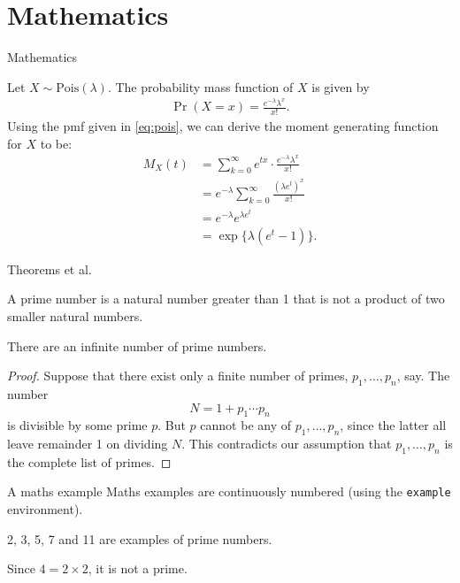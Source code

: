 \documentclass[]{beamer}
\begin{document}
\section{Mathematics}



\begin{frame}{Mathematics}

Let $X\sim\mathrm{Pois}(\lambda)$. 
The probability mass function of $X$ is given by
\begin{align}\label{eq:pois}
	\Pr(X=x) = \frac{e^{-\lambda}\lambda^x}{x!}.
\end{align}
Using the pmf given in \eqref{eq:pois}, we can derive the moment generating function for $X$ to be:
\begin{align*}
	M_X(t) 
	&= \sum_{k=0}^\infty e^{tx} \cdot \frac{e^{-\lambda}\lambda^x}{x!} \\
	&= e^{-\lambda} \sum_{k=0}^\infty  \frac{(\lambda e^t)^x}{x!} \\
	&= e^{-\lambda}  e^{\lambda e^t} \\
	&= \exp\{\lambda(e^t - 1) \}.
\end{align*}


\end{frame}

\begin{frame}{Theorems et al.}

\begin{definition}
	A prime number is a natural number greater than 1 that is not a product of two smaller natural numbers.
\end{definition}

\begin{theorem}
	There are an infinite number of prime numbers.
\end{theorem}

\begin{proof}
	Suppose that there exist only a finite number of primes, $p_1,\dots,p_n$, say.
	The number 
	\[
	  N = 1+p_1\cdots p_n
	\]
	is divisible by some prime $p$.
	But $p$ cannot be any of $p_1,\dots,p_n$, since the latter all leave remainder 1 on dividing $N$.
	This contradicts our assumption that $p_1,\dots,p_n$ is the complete list of primes.
\end{proof}

\end{frame}

\begin{frame}{A maths example}
	Maths examples are continuously numbered (using the \texttt{example} environment).
	
	\begin{example}
		2, 3, 5, 7 and 11 are examples of prime numbers.
	\end{example}

	\begin{example}
		Since $4 = 2 \times 2$, it is not a prime.
	\end{example}

\end{frame}
\end{document}
